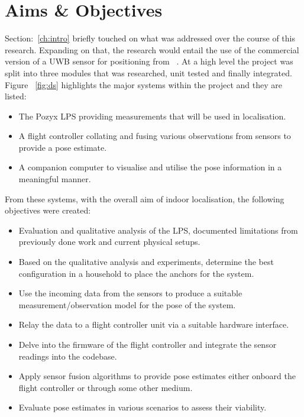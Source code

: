 \section{Aims \& Objectives}\label{sec:aims_objs}

Section:~\ref{ch:intro} briefly touched on what was addressed over the course of this research.
Expanding on that, the research would entail the use of the commercial version of a UWB sensor for positioning from ~\cite{pozyx2018pozyx}.
At a high level the project was split into three modules that was researched, unit tested and finally integrated.
Figure ~\ref{fig:ds} highlights the major systems within the project and they are listed:
\begin{itemize}
    \item The Pozyx LPS providing measurements that will be used in localisation.
    \item A flight controller collating and fusing various observations from sensors to provide a pose estimate.
    \item A companion computer to visualise and utilise the pose information in a meaningful manner.
\end{itemize}

From these systems, with the overall aim of indoor localisation, the following objectives were created:
\begin{itemize}
    \item Evaluation and qualitative analysis of the LPS, documented limitations from previously done work and current physical setups.
    \item Based on the qualitative analysis and experiments, determine the best configuration in a household to place the anchors for the system.
    \item Use the incoming data from the sensors to produce a suitable measurement/observation model for the pose of the system.
    \item Relay the data to a flight controller unit via a suitable hardware interface.
    \item Delve into the firmware of the flight controller and integrate the sensor readings into the codebase.
    \item Apply sensor fusion algorithms to provide pose estimates either onboard the flight controller or through some other medium.
    \item Evaluate pose estimates in various scenarios to assess their viability.
\end{itemize}

